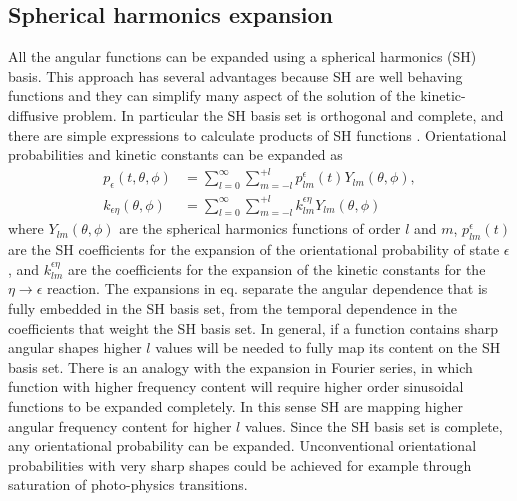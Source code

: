 \documentclass{article}
\begin{document}
\subsection{Spherical harmonics expansion}
All the angular functions can be expanded using a spherical harmonics (SH) basis. This approach has several advantages because SH are well behaving functions and they can simplify many aspect of the solution of the kinetic-diffusive problem. In particular the SH basis set is orthogonal and complete, and there are simple expressions to calculate products of SH functions \cite{CourantHilbertV1, Wieczorek2018}.
Orientational probabilities and kinetic constants can be expanded as
\begin{equation}\label{eq:sh_expansion}
\begin{aligned}
    p_\epsilon(t,\theta,\phi) &= \sum_{l=0}^{\infty} \sum_{m=-l}^{+l} p^{\epsilon}_{lm}(t) Y_{lm}(\theta,\phi), \\
    k_{\epsilon\eta}(\theta,\phi) &= \sum_{l=0}^{\infty} \sum_{m=-l}^{+l} k^{\epsilon\eta}_{lm} Y_{lm}(\theta,\phi)
\end{aligned}
\end{equation}
where $Y_{lm}(\theta,\phi)$ are the spherical harmonics functions of order $l$ and $m$, $p^{\epsilon}_{lm}(t)$ are the SH coefficients for the expansion of the orientational probability of state $\epsilon$, and $k^{\epsilon\eta}_{lm}$ are the coefficients for the expansion of the kinetic constants for   the $\eta \rightarrow \epsilon$ reaction.
The expansions in eq.  separate the angular dependence that is fully embedded in the SH basis set, from the temporal dependence in the coefficients that weight the SH basis set.
In general, if a function contains sharp angular shapes higher $l$ values will be needed to fully map its content on the SH basis set. There is an analogy with the expansion in Fourier series, in which function with higher frequency content will require higher order sinusoidal functions to be expanded completely. In this sense SH are mapping higher angular frequency content for higher $l$ values. Since the SH basis set is complete, any orientational probability can be expanded. Unconventional orientational probabilities with very sharp shapes could be achieved for example through saturation of photo-physics transitions.
\end{document}
